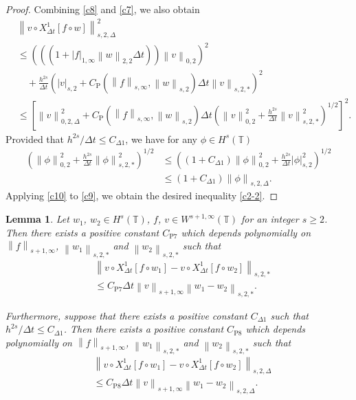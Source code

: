 \documentclass[10pt,a4paper,tbtags,leqno]{amsart}
\newtheorem{lemma}[theorem]{Lemma}
\theoremstyle{definition}
\numberwithin{equation}{section}
\def\norm#1#2{\left\|#2\right\|_{#1}}
\def\snorm#1#2{\left|#2\right|_{#1}}
\begin{document}
\begin{proof}
  Combining \eqref{c8} and \eqref{c7}, we also obtain 
  \begin{align}
    & \norm{s, 2, \Delta}{v \circ {X_{\Delta t}^1}[f \circ w]}^2 \\ & \leq \left(\left((1 + \snorm{1, \infty}{f} \norm{2, 2}{w} \Delta t)\right) \norm{0, 2}{v}\right)^2 \\ & \quad + \frac{h^{2s}}{\Delta t} \left(\snorm{s, 2}{v} + C_{\mathrm{P}} (\norm{s, \infty}{f}, \norm{s, 2}{w}) \Delta t \norm{s, 2, \ast}{v}\right)^2 \\
    & \leq \left[\norm{0, 2, \Delta}{v}^2 + C_{\mathrm{P}} (\norm{s, \infty}{f}, \norm{s, 2}{w}) \Delta t \left(\norm{0, 2}{v}^2 + \frac{h^{2s}}{\Delta t} \norm{s, 2, \ast}{v}^2 \right)^{1 / 2}\right]^2. \label{c9}
  \end{align}
  Provided that $ h^{2s} / \Delta t \leq C_{\Delta 1} $, we have for any $ \phi \in H^s (\mathbb{T}) $
  \begin{align}
    \left(\norm{0, 2}{\phi}^2 + \frac{h^{2s}}{\Delta t} \norm{s, 2, \ast}{\phi}^2 \right)^{1 / 2} 
    & \leq \left((1 + C_{\Delta 1}) \norm{0, 2}{\phi}^2 + \frac{h^{2s}}{\Delta t} \snorm{s, 2}{\phi}^2 \right)^{1 / 2} \\
    & \leq (1 + C_{\Delta 1}) \norm{s, 2, \Delta}{\phi}. 
    \label{c10}
  \end{align} 
  Applying \eqref{c10} to \eqref{c9}, we obtain the desired inequality \eqref{c2-2}. 
\end{proof} 

\begin{lemma} \label{lem:d} 
  Let $ w_1 $, $ w_2 \in H^s (\mathbb{T}) $, $ f $, $ v \in W^{s + 1, \infty} (\mathbb{T}) $ for an integer $ s \geq 2 $. Then there exists a positive constant $ C_{\mathrm{P}7} $ which depends polynomially on $ \norm{s + 1, \infty}{f} $, $ \norm{s, 2, \ast}{w_1} $ and $ \norm{s, 2, \ast}{w_2} $ such that 
  \begin{align}
    & \norm{s, 2, \ast}{v \circ {X_{\Delta t}^1} [f \circ w_1] - v \circ {X_{\Delta t}^1} [f \circ w_2]} \\ & \leq C_{\mathrm{P}7} \Delta t \norm{s + 1, \infty}{v} \norm{s, 2, \ast}{w_1 - w_2}. \label{d4} 
  \end{align} 

  Furthermore, suppose that there exists a positive constant $ C_{\Delta 1} $ such that $ h^{2 s} / \Delta t \leq C_{\Delta 1} $. Then there exists a positive constant $ C_{\mathrm{P}8} $ which depends polynomially on $ \norm{s + 1, \infty}{f} $, $ \norm{s, 2, \ast}{w_1} $ and $ \norm{s, 2, \ast}{w_2} $ such that 
  \begin{align} 
    & \norm{s, 2, \Delta}{v \circ {X_{\Delta t}^1} [f \circ w_1] - v \circ {X_{\Delta t}^1} [f \circ w_2]} \\ & \leq C_{\mathrm{P}8} \Delta t \norm{s + 1, \infty}{v} \norm{s, 2, \Delta}{w_1 - w_2}. \label{d22} 
  \end{align} 
\end{lemma} 
\end{document}
